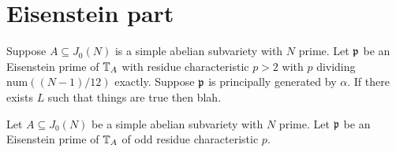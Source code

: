 \documentclass[thesis.tex]{subfiles}
\begin{document}
\section{Eisenstein part}%
\label{sec:eisenstein_part}

\begin{corollary}
    Suppose $A\subseteq J_0(N)$ is a simple abelian subvariety with $N$ prime.
    Let $\mathfrak{p}$ be an Eisenstein prime of $\mathbb{T}_A$ with residue characteristic
    $p>2$ with $p$ dividing $\mathrm{num}((N-1)/12)$ exactly. Suppose $\mathfrak{p}$ is
    principally generated by $\alpha$. If there exists $L$ such that things are
    true then blah.
\end{corollary}

\begin{proposition}{{\cite[Prop. 4.5]{klosin-papikian:ribet}}}%
    \label{prop:eisenstein_cyclic}
    Let $A\subseteq J_0(N)$ be a simple abelian subvariety with $N$ prime. Let
    $\mathfrak{p}$ be an Eisenstein prime of $\mathbb{T}_A$ of odd residue characteristic $p$. 
\end{proposition}
\end{document}
